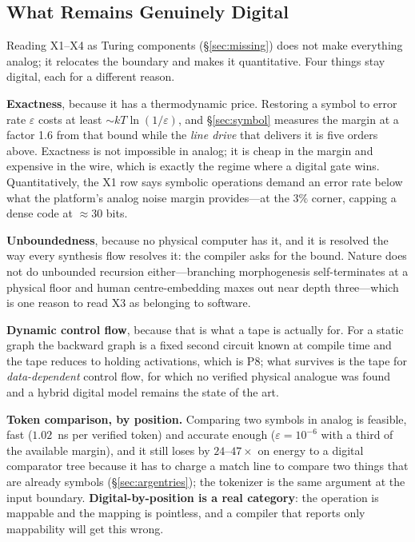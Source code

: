 \documentclass[11pt]{article}
\begin{document}
\subsection{What Remains Genuinely Digital}
\label{sec:digital}

Reading X1--X4 as Turing components (\S\ref{sec:missing}) does not make everything analog; it relocates the boundary and makes it quantitative. Four things stay digital, each for a different reason.

\textbf{Exactness}, because it has a thermodynamic price. Restoring a symbol to error rate $\varepsilon$ costs at least ${\sim}kT\ln(1/\varepsilon)$, and \S\ref{sec:symbol} measures the margin at a factor 1.6 from that bound while the \textit{line drive} that delivers it is five orders above. Exactness is not impossible in analog; it is cheap in the margin and expensive in the wire, which is exactly the regime where a digital gate wins. Quantitatively, the X1 row says symbolic operations demand an error rate below what the platform's analog noise margin provides---at the $3\%$ corner, capping a dense code at ${\approx}30$ bits.

\textbf{Unboundedness}, because no physical computer has it, and it is resolved the way every synthesis flow resolves it: the compiler asks for the bound. Nature does not do unbounded recursion either---branching morphogenesis self-terminates at a physical floor and human centre-embedding maxes out near depth three---which is one reason to read X3 as belonging to software.

\textbf{Dynamic control flow}, because that is what a tape is actually for. For a static graph the backward graph is a fixed second circuit known at compile time and the tape reduces to holding activations, which is P8; what survives is the tape for \textit{data-dependent} control flow, for which no verified physical analogue was found and a hybrid digital model remains the state of the art.

\textbf{Token comparison, by position.} Comparing two symbols in analog is feasible, fast ($1.02$~ns per verified token) and accurate enough ($\varepsilon = 10^{-6}$ with a third of the available margin), and it still loses by $24$--$47\times$ on energy to a digital comparator tree because it has to charge a match line to compare two things that are already symbols (\S\ref{sec:argentries}); the tokenizer is the same argument at the input boundary. \textbf{Digital-by-position is a real category}: the operation is mappable and the mapping is pointless, and a compiler that reports only mappability will get this wrong.
\end{document}
